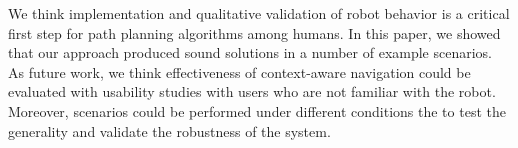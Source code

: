 \documentclass[3p]{elsarticle}
\begin{document}

We think implementation and qualitative validation of robot behavior is a critical first step for path planning algorithms among humans. In this paper, we showed that our approach produced sound solutions in a number of example scenarios. As future work, we think effectiveness of context-aware navigation could be evaluated with usability studies with users who are not familiar with the robot. Moreover, scenarios could be performed under different conditions the to test the generality and validate the robustness of the system.







%

\end{document}

